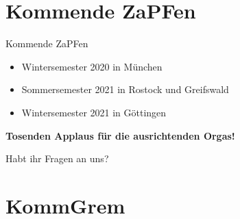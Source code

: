 \documentclass[compress, aspectratio=169]{beamer}
\begin{document}
\section{Kommende ZaPFen}
\begin{frame}{Kommende ZaPFen}
  \begin{itemize}
    \item Wintersemester 2020 in München
    \item Sommersemester 2021 in Rostock und Greifswald
    \item Wintersemester 2021 in Göttingen
    \end{itemize}
    \vspace{1cm}
    \begin{center}
      \huge \textbf{Tosenden Applaus für die ausrichtenden Orgas!}
    \end{center}
\end{frame}

\begin{frame}[plain]
  \begin{center}
    \Huge Habt ihr Fragen an uns?
    \end{center}
\end{frame}

\section{KommGrem}
\end{document}
